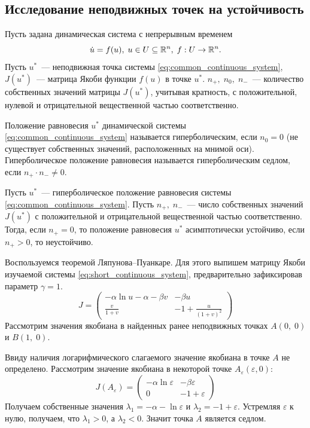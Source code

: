 \subsection{Исследование неподвижных точек на устойчивость}

Пусть задана динамическая система с непрерывным временем
\begin{equation}\label{eq:common_continuous_system}
        \dot u = f(u),\; u \in U \subseteq \mathbb{R}^n,\; f:U\rightarrow\mathbb{R}^n.
\end{equation}
Пусть $u^*$~--- неподвижная точка системы \ref{eq:common_continuous_system}, $J(u^*)$~--- матрица Якоби функции $f(u)$ в точке $u^*$. $n_+,\; n_0,\; n_-$~--- количество собственных значений матрицы $J(u^*)$, учитывая кратность, с положительной, нулевой и отрицательной вещественной частью соответственно.

\begin{definition}
        Положение равновесия $u^*$ динамической системы \ref{eq:common_continuous_system} называется гиперболическим, если $n_0 = 0$ (не существует собственных значений, расположенных на мнимой оси). Гиперболическое положение равновесия называется гиперболическим седлом, если $n_+\cdot n_- \neq 0$.
\end{definition}
\begin{theorem}
        Пусть $u^*$~--- гиперболическое положение равновесия системы \ref{eq:common_continuous_system}. Пусть $n_+,\; n_-$~--- число собственных значений $J(u^*)$ с положительной и отрицательной вещественной частью соответственно. Тогда, если $n_+ = 0$, то положение равновесия $u^*$ асимптотически устойчиво, если $n_+ > 0$, то неустойчиво. \cite[стр.~107]{bratus10}
\end{theorem}

Воспользуемся теоремой Ляпунова--Пуанкаре. Для этого выпишем матрицу Якоби изучаемой системы \ref{eq:short_continuous_system}, предварительно зафиксировав параметр $\gamma = 1$.
$$
        J =
        \begin{pmatrix}
                -\alpha\ln u-\alpha-\beta v & -\beta u\\
                \frac{v}{1+v} & -1 + \frac{u}{(1 + v)^2}
        \end{pmatrix}
$$
Рассмотрим значения якобиана в найденных ранее неподвижных точках $A(0,\;0)$ и $B(1,\;0)$.

Ввиду наличия логарифмического слагаемого значение якобиана в точке $A$ не определено. Рассмотрим значение якобиана в некоторой точке $A_\varepsilon(\varepsilon, 0)$:
$$
        J(A_\varepsilon) =
        \begin{pmatrix}
                -\alpha\ln\varepsilon & -\beta\varepsilon\\
                0 & -1 + \varepsilon
        \end{pmatrix}
$$
Получаем собственные значения $\lambda_1 = -\alpha - \ln\varepsilon$ и $\lambda_2=-1+\varepsilon$. Устремляя $\varepsilon$ к нулю, получаем, что $\lambda_1 > 0$, а $\lambda_2 < 0$. Значит точка $A$ является седлом.

